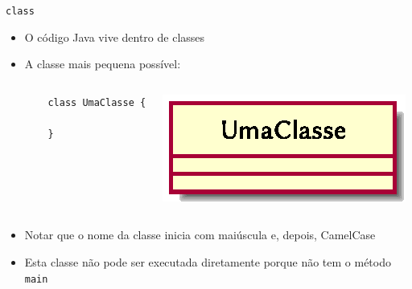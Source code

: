\documentclass[portuguese, aspectratio=169, xcolor=table]{beamer}
\begin{document}
\begin{frame}[fragile]{\texttt{class}}
\begin{itemize}
    \item O código Java vive dentro de classes
    \item A classe mais pequena possível:
\begin{columns}
    \begin{verbatim}
    class UmaClasse {
        
    }
\end{verbatim}
\begin{center}
\includegraphics[scale=1]{./uml_diagrams/class0}
\end{center}
\end{columns}
\vspace{0.25cm}
\item Notar que o nome da classe inicia com maiúscula e, depois, CamelCase
\item Esta classe não pode ser executada diretamente porque não tem o método \texttt{main}
\end{itemize}
\end{frame}    
    
\end{document}
